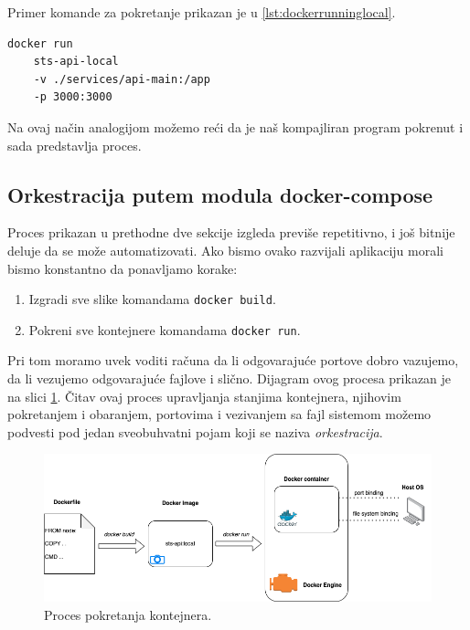 \documentclass[12pt,oneside]{memoir}
\begin{document}
Primer komande za pokretanje prikazan je u \ref{lst:dockerrunninglocal}.

\begin{lstlisting}[caption={Pokretanje kontejnera}, label={lst:dockerrunninglocal}]
docker run 
    sts-api-local 
    -v ./services/api-main:/app 
    -p 3000:3000
\end{lstlisting}

Na ovaj način analogijom možemo reći da je naš kompajliran program pokrenut i sada predstavlja proces.

\subsection{Orkestracija putem modula docker-compose}

Proces prikazan u prethodne dve sekcije izgleda previše repetitivno, i još bitnije deluje da se može automatizovati. Ako bismo ovako razvijali aplikaciju morali bismo konstantno da ponavljamo korake:
\begin{enumerate}
    \item Izgradi sve slike komandama \verb|docker build|.
    \item Pokreni sve kontejnere komandama \verb|docker run|.
\end{enumerate}

Pri tom moramo uvek voditi računa da li odgovarajuće portove dobro vazujemo, da li vezujemo odgovarajuće fajlove i slično. Dijagram ovog procesa prikazan je na slici \ref{fig:dockermanual}. Čitav ovaj proces upravljanja stanjima kontejnera, njihovim pokretanjem i obaranjem, portovima i vezivanjem sa fajl sistemom možemo podvesti pod jedan sveobuhvatni pojam koji se naziva \textit{orkestracija}.

\begin{figure}[h]
  \centering
  \includegraphics[width=1\textwidth]{docs/images/ch_6/dockermanual.png} 
  \caption{Proces pokretanja kontejnera.}
  \label{fig:dockermanual}
\end{figure}
\end{document}
